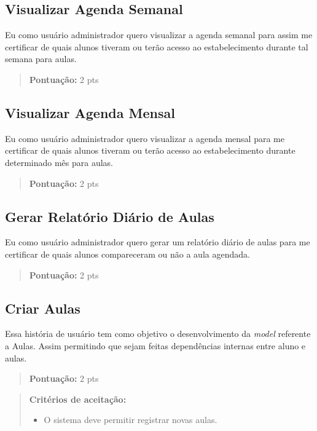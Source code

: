 \subsection[Visualizar Agenda Semanal]{Visualizar Agenda Semanal}
Eu como usuário administrador quero visualizar a agenda semanal para assim me
certificar de quais alunos tiveram ou terão acesso ao estabelecimento durante tal
semana para aulas.
\begin{quote}
    \textbf{Pontuação:} 2 pts
\end{quote}

\subsection[Visualizar Agenda Mensal]{Visualizar Agenda Mensal}
Eu como usuário administrador quero visualizar a agenda mensal para me
certificar de quais alunos tiveram ou terão acesso ao estabelecimento durante
determinado mês para aulas.
\begin{quote}
    \textbf{Pontuação:} 2 pts
\end{quote}

\subsection[Gerar Relatório Diário de Aulas]{Gerar Relatório Diário de Aulas}
Eu como usuário administrador quero gerar um relatório diário de aulas para me
certificar de quais alunos compareceram ou não a aula agendada.
\begin{quote}
    \textbf{Pontuação:} 2 pts
\end{quote}

\subsection[Criar Aulas]{Criar Aulas}
Essa história de usuário tem como objetivo o desenvolvimento da \textsl{model} referente
a Aulas. Assim permitindo que sejam feitas dependências internas entre aluno
e aulas.
\begin{quote}
    \textbf{Pontuação:} 2 pts
\end{quote}
\begin{quote}
\textbf{Critérios de aceitação:}
    \begin{itemize}
        \item O sistema deve permitir registrar novas aulas.
    \end{itemize}
\end{quote}

